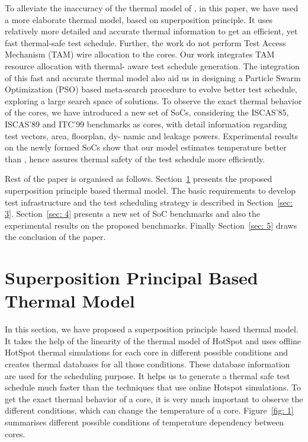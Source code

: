 \documentclass[conference]{IEEEtran}
\begin{document}
	\par
	To alleviate the inaccuracy of the thermal model of \cite{yao2011power}, in
this paper, we have used a more elaborate thermal model, based
on superposition principle. It uses relatively more detailed
and accurate thermal information to get an efficient, yet fast
thermal-safe test schedule. Further, the work \cite{yao2011power} do not perform
Test Access Mechanism (TAM) wire allocation to the cores.
Our work integrates TAM resource allocation with thermal-
aware test schedule generation. The integration of this fast
and accurate thermal model also aid us in designing a Particle
Swarm Optimization (PSO) \cite{kennedy2011particle} based meta-search procedure
to evolve better test schedule, exploring a large search space
of solutions. To observe the exact thermal behavior of the
cores, we have introduced a new set of SoCs, considering the
ISCAS’85, ISCAS’89 and ITC’99 benchmarks as cores, with
detail information regarding test vectors, area, floorplan, dy-
namic and leakage powers. Experimental results on the newly
formed SoCs show that our model estimates temperature better
than \cite{yao2011power}, hence assures thermal safety of the test schedule more
efficiently.\\

	\par
	Rest of the paper is organised as follows. Section~\ref{sec: 2}
presents the proposed superposition principle based thermal
model. The basic requirements to develop test infrastructure
and the test scheduling strategy is described in Section~\ref{sec: 3}.
Section~\ref{sec: 4} presents a new set of SoC benchmarks and also
the experimental results on the proposed benchmarks. Finally
Section~\ref{sec: 5} draws the conclusion of the paper.\\


	\section{Superposition Principal Based Thermal Model}
	\label{sec: 2}
	
	In this section, we have proposed a superposition principle
based thermal model. It takes the help of the linearity of the
thermal model of HotSpot and uses offline HotSpot \cite{stan2003hotspot} thermal
simulations for each core in different possible conditions
and creates thermal databases for all those conditions. These
database information are used for the scheduling purpose. It
helps us to generate a thermal safe test schedule much faster
than the techniques that use online Hotspot simulations. To get
the exact thermal behavior of a core, it is very much important
to observe the different conditions, which can change the
temperature of a core. Figure~\ref{fig: 1} summarises different possible
conditions of temperature dependency between cores.
\end{document}
